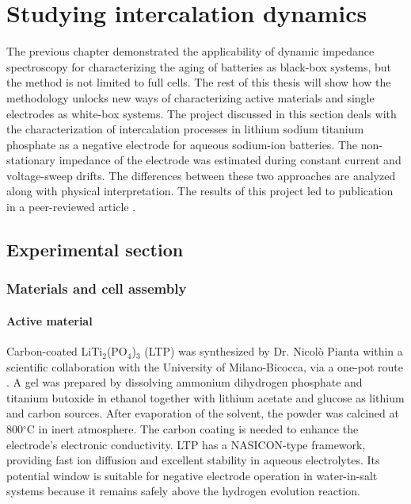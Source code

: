 \chapter{Studying intercalation dynamics}
\label{chap:LTP}

The previous chapter demonstrated the applicability of dynamic impedance spectroscopy for characterizing the aging of batteries as black-box systems, but the method is not limited to full cells. The rest of this thesis will show how the methodology unlocks new ways of characterizing active materials and single electrodes as white-box systems.
The project discussed in this section deals with the characterization of intercalation processes in lithium sodium titanium phosphate as a negative electrode for aqueous sodium-ion batteries. The non-stationary impedance of the electrode was estimated during constant current and voltage-sweep drifts. The differences between these two approaches are analyzed along with physical interpretation. The results of this project led to publication in a peer-reviewed article \cite{scarpioniElectrochemicalImpedanceSpectroscopy2023a}.

\section{Experimental section}

\subsection{Materials and cell assembly}

\subsubsection{Active material}


Carbon-coated LiTi$_2$(PO$_4$)$_3$ (LTP) was synthesized by Dr. Nicolò Pianta within a scientific collaboration with the University of Milano-Bicocca, via a one-pot route \cite{scarpioniElectrochemicalImpedanceSpectroscopy2023a}. A gel was prepared by dissolving ammonium dihydrogen phosphate and titanium butoxide in ethanol together with lithium acetate and glucose as lithium and carbon sources. After evaporation of the solvent, the powder was calcined at 800$^\circ$C in inert atmosphere. The carbon coating is needed to enhance the electrode's electronic conductivity. LTP has a NASICON-type framework, providing fast ion diffusion and excellent stability in aqueous electrolytes. Its potential window is suitable for negative electrode operation in water-in-salt systems because it remains safely above the hydrogen evolution reaction.

